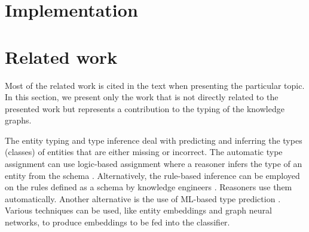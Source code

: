 \documentclass[runningheads]{llncs}
\newcommand{\memo}[1]{}
\newcommand{\notes}[1]{\noindent\begin{small}-- \emph{#1}\hfill\break\end{small}}
\newcommand{\nnotes}[1]{\indent\begin{small}-- \emph{#1}\hfill\break\end{small}}
\begin{document}
\memo{
\medskip
\notes{How to compute $T\preceq\/S$? Refer to position where we have a description.}
\notes{Order the possible derivations, gatherings (groupings) ... of types.}

\notes{Possible diagnoses.}
\notes{Components not related to a top type of a triple?}
\notes{Components related to sub-types of a top type?}
\notes{Above pertain to all components.}}

\memo{
\subsection{Typing a graph}

\notes{What is a type of a graph?}
\nnotes{A type of a graph is a graph!}
\nnotes{It includes a set of triple types forming a schema graph.}

\notes{Typing schema triples?}
\nnotes{What can be checked?}
\nnotes{Is a schema triple properly related to the super-classes and types of components.}
\nnotes{Consistency of the placement of a class in an ontology.}
\nnotes{A class or predicate component not related to other classes?}
\nnotes{A class or predicate component attached to ``conflicting'' set of classes? ?}
\nnotes{Any other examples?}

\notes{Typing a graph.}
\nnotes{Checking whether triple types match in the meeting points.}
\nnotes{What is the type in meeting points of two triple types?}
\nnotes{Since a tye of a graph should present any legal triple in $\D$}
}




\section{Implementation}





\section{Related work}

Most of the related work is cited in the text when presenting the
particular topic. In this section, we present only the work that is not
directly related to the presented work but represents a contribution
to the typing of the knowledge graphs.

The entity typing and type inference deal with predicting and
inferring the types (classes) of entities that are either missing or
incorrect. The automatic type assignment can use logic-based
assignment where a reasoner infers the type of an entity from the
schema \cite{Horrocks2003}. Alternatively, the rule-based inference
can be employed on the rules defined as a schema by knowledge
engineers \cite{Horrocks2004}. Reasoners use them
automatically. Another alternative is the use of ML-based type
prediction \cite{Yaghoobzadeh2018}. Various techniques can be used, like entity embeddings and graph neural networks, to produce embeddings
to be fed into the classifier.
\end{document}
